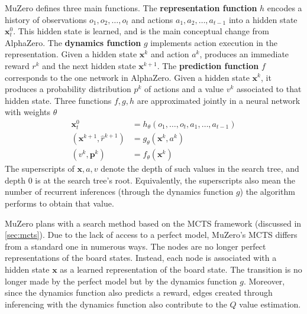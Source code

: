 MuZero defines three main functions.
The \textbf{representation function} $h$ encodes a history of observations $o_1, o_2, \dots, o_t$ and actions $a_1, a_2, \dots, a_{t - 1}$ into a hidden state $\mathbf{x}_t^0$.
This hidden state is learned, and is the main conceptual change from AlphaZero.
The \textbf{dynamics function} $g$ implements action execution in the representation.
Given a hidden state $\mathbf{x}^k$ and action $a^k$, produces an immediate reward $r^k$ and the next hidden state $\mathbf{x}^{k+1}$.
The \textbf{prediction function} $f$ corresponds to the one network in AlphaZero.
Given a hidden state $\mathbf{x}^k$, it produces a probability distribution $p^k$ of actions and a value $v^k$ associated to that hidden state.
Three functions $f, g, h$ are approximated jointly in a neural network with weights $\theta$
\begin{align}
    \mathbf{x}^0_t                     & = h_{\theta}(o_1, \dots, o_t, a_1, \dots, a_{t - 1}) \label{eq:muzero_h}  \\
    (\mathbf{x}^{k+1}, \hat{r}^{k+1})  & = g_{\theta}(\mathbf{x}^k, a^k)  \label{eq:muzero_g}  \\
    (v^k, \pmb{p}^k)                   & = f_{\theta}(\mathbf{x}^k) \label{eq:muzero_f}
\end{align}
The superscripts of $\mathbf{x}, a, v$ denote the depth of such values in the search tree, and depth $0$ is at the search tree's root.
Equivalently, the superscripts also mean the number of recurrent inferences (through the dynamics function $g$) the algorithm performs to obtain that value.

MuZero plans with a search method based on the MCTS framework (discussed in \ref{sec:mcts}).
Due to the lack of access to a perfect model, MuZero's MCTS differs from a standard one in numerous ways.
The nodes are no longer perfect representations of the board states.
Instead, each node is associated with a hidden state $\mathbf{x}$ as a learned representation of the board state.
The transition is no longer made by the perfect model but by the dynamics function $g$.
Moreover, since the dynamics function also predicts a reward, edges created through inferencing with the dynamics function also contribute to the $Q$ value estimation.

